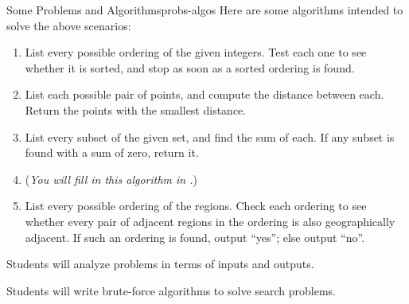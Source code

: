 \documentclass{tufte-handout}
\begin{document}
\begin{model}{Some Problems and Algorithms}{probs-algos}
\vspace{0.5in}
Here are some algorithms intended to solve the above scenarios:
  \begin{enumerate}[label=(\alph*)]
  \item List every possible ordering of the given integers.  Test each
    one to see whether it is sorted, and stop as soon as a sorted
    ordering is found.
  \item List each possible pair of points, and compute the distance
    between each.  Return the points with the smallest distance.
  \item List every subset of the given set, and find the sum of each.
    If any subset is found with a sum of zero, return it.
  \item (\emph{You will fill in this algorithm in .})
  \item List every possible ordering of the regions.  Check each
    ordering to see whether every pair of adjacent regions in the
    ordering is also geographically adjacent.  If such an ordering is
    found, output ``yes''; else output ``no''.
  \end{enumerate}
\end{model}

\begin{objective}
  Students will analyze problems in terms of inputs and outputs.
\end{objective}

\begin{objective}
  Students will write brute-force algorithms to solve search problems.
\end{objective}
\end{document}
